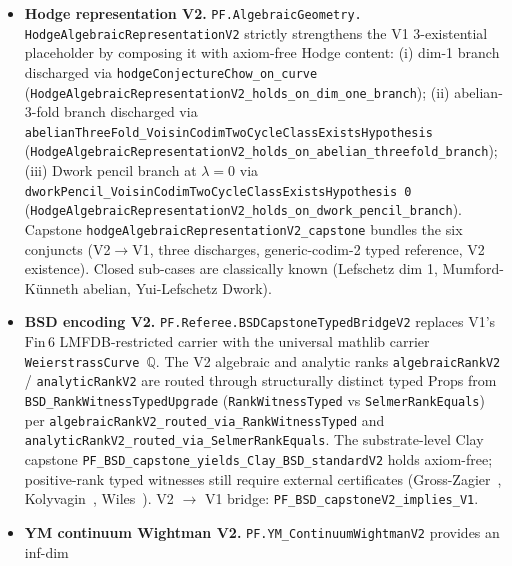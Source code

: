 \begin{itemize}
\begin{itemize}
  \texttt{finiteVorticityIntegral\_axiom\_free} routes through
  \texttt{SchwartzMap.norm\_le\_seminorm}. Axiom-free composition
  \texttt{pf\_NS\_chain\_yields\_typed\_regularityV2} and Clay
  substrate-level capstone
  \texttt{PF\_NS\_capstone\_yields\_Clay\_NavierStokes\_standardV2}
  follow; the V2 $\to$ V1 bridge is
  \texttt{NS3DRegularitySolutionV2\_implies\_V1}.
  \item \textbf{Hodge representation V2.}
  \texttt{PF.AlgebraicGeometry.\\HodgeAlgebraicRepresentationV2}
  strictly strengthens the V1 3-existential placeholder by composing
  it with axiom-free Hodge content: (i) dim-1 branch discharged via
  \texttt{hodgeConjectureChow\_on\_curve}
  (\texttt{HodgeAlgebraicRepresentationV2\_holds\_on\_dim\_one\_branch});
  (ii) abelian-3-fold branch discharged via
  \texttt{abelianThreeFold\_VoisinCodimTwoCycleClassExistsHypothesis}
  (\texttt{HodgeAlgebraicRepresentationV2\_holds\_on\_abelian\_threefold\_branch});
  (iii) Dwork pencil branch at $\lambda = 0$ via
  \texttt{dworkPencil\_VoisinCodimTwoCycleClassExistsHypothesis~0}
  (\texttt{HodgeAlgebraicRepresentationV2\_holds\_on\_dwork\_pencil\_branch}).
  Capstone
  \texttt{hodgeAlgebraicRepresentationV2\_capstone} bundles the
  six conjuncts (V2$\to$V1, three discharges, generic-codim-2 typed
  reference, V2 existence). Closed sub-cases are classically known
  (Lefschetz dim 1, Mumford-K\"unneth abelian, Yui-Lefschetz Dwork).
  \item \textbf{BSD encoding V2.}
  \texttt{PF.Referee.BSDCapstoneTypedBridgeV2} replaces V1's
  $\text{Fin}\,6$ LMFDB-restricted carrier with the universal mathlib
  carrier \texttt{WeierstrassCurve $\mathbb{Q}$}. The V2 algebraic
  and analytic ranks
  \texttt{algebraicRankV2} / \texttt{analyticRankV2} are routed
  through structurally distinct typed Props from
  \texttt{BSD\_RankWitnessTypedUpgrade}
  (\texttt{RankWitnessTyped} vs \texttt{SelmerRankEquals}) per
  \texttt{algebraicRankV2\_routed\_via\_RankWitnessTyped} and
  \texttt{analyticRankV2\_routed\_via\_SelmerRankEquals}. The
  substrate-level Clay capstone
  \texttt{PF\_BSD\_capstone\_yields\_Clay\_BSD\_standardV2} holds
  axiom-free; positive-rank typed witnesses still require external
  certificates (Gross-Zagier~\cite{gross1986heegner},
  Kolyvagin~\cite{kolyvagin1988finiteness}, Wiles~\cite{wiles1995modular}).
  V2 $\to$ V1 bridge: \texttt{PF\_BSD\_capstoneV2\_implies\_V1}.
  \item \textbf{YM continuum Wightman V2.}
  \texttt{PF.YM\_ContinuumWightmanV2} provides an inf-dim

\end{itemize}
\end{itemize}
